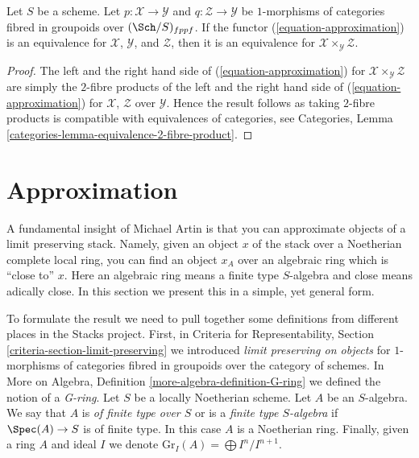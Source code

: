 \begin{lemma}
\label{lemma-fibre-product-effective}
Let $S$ be a scheme. Let $p : \mathcal{X} \to \mathcal{Y}$ and
$q : \mathcal{Z} \to \mathcal{Y}$ be $1$-morphisms of categories
fibred in groupoids over $(\Sch/S)_{fppf}$. If the functor
(\ref{equation-approximation}) is an equivalence for 
$\mathcal{X}$, $\mathcal{Y}$, and $\mathcal{Z}$, then it is 
an equivalence for $\mathcal{X} \times_\mathcal{Y} \mathcal{Z}$.
\end{lemma}

\begin{proof}
The left and the right hand side of (\ref{equation-approximation})
for $\mathcal{X} \times_\mathcal{Y} \mathcal{Z}$ are simply the $2$-fibre
products of the left and the right hand side of (\ref{equation-approximation})
for $\mathcal{X}$, $\mathcal{Z}$ over $\mathcal{Y}$.
Hence the result follows as taking $2$-fibre products is compatible
with equivalences of categories, see
Categories, Lemma \ref{categories-lemma-equivalence-2-fibre-product}.
\end{proof}






\section{Approximation}
\label{section-approximation}

\noindent
A fundamental insight of Michael Artin is that you can approximate
objects of a limit preserving stack. Namely, given an object $x$
of the stack over a Noetherian complete local ring, you can find
an object $x_A$ over an algebraic ring which is ``close to'' $x$.
Here an algebraic ring means a finite type $S$-algebra and close
means adically close. In this section we present this in a simple,
yet general form.

\medskip\noindent
To formulate the result we need to pull together some definitions from
different places in the Stacks project. First, in
Criteria for Representability, Section \ref{criteria-section-limit-preserving}
we introduced {\it limit preserving on objects} for $1$-morphisms
of categories fibred in groupoids over the category of schemes.
In More on Algebra, Definition \ref{more-algebra-definition-G-ring}
we defined the notion of a {\it G-ring}. Let $S$ be a locally Noetherian scheme.
Let $A$ be an $S$-algebra. We say that $A$ is {\it of finite type over $S$}
or is a {\it finite type $S$-algebra} if $\Spec(A) \to S$ is of finite type.
In this case $A$ is a Noetherian ring. Finally, given a ring $A$ and ideal
$I$ we denote $\text{Gr}_I(A) = \bigoplus I^n/I^{n + 1}$.

